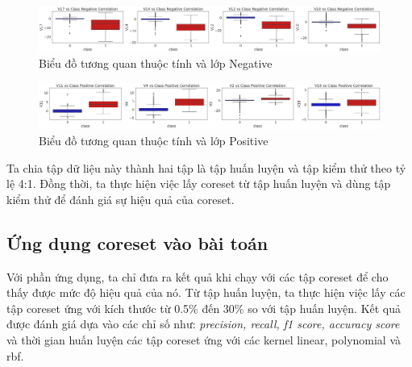 \documentclass[a4paper, 12pt, oneside]{report}
\begin{document}
\begin{center}
    \begin{figure}[H]
    \begin{center}
     \includegraphics[scale=0.2]{feature_class_negative_correlation.png}
     \caption{Biểu đồ tương quan thuộc tính và lớp Negative}
    \end{center}
    \label{Hình 5.3}
    \end{figure}
\end{center}
\begin{center}
    \begin{figure}[H]
    \begin{center}
     \includegraphics[scale=0.2]{feature_class_positive_correlation.png}
     \caption{Biểu đồ tương quan thuộc tính và lớp Positive}
    \end{center}
    \label{Hình 5.4}
    \end{figure}
\end{center}
Ta chia tập dữ liệu này thành hai tập là tập huấn luyện và tập kiểm thử theo tỷ lệ 4:1. Đồng thời, ta thực hiện việc lấy coreset từ tập huấn luyện và dùng tập kiểm thử để đánh giá sự hiệu quả của coreset.

\subsection{Ứng dụng coreset vào bài toán}
Với phần ứng dụng, ta chỉ đưa ra kết quả khi chạy với các tập coreset để cho thấy được mức độ hiệu quả của nó. Từ tập huấn luyện, ta thực hiện việc lấy các tập coreset ứng với kích thước từ 0.5\% đến 30\% so với tập huấn luyện. Kết quả được đánh giá dựa vào các chỉ số như: \textit{precision, recall, f1 score, accuracy score} và thời gian huấn luyện các tập coreset ứng với các kernel linear, polynomial và rbf.\\
\end{document}

